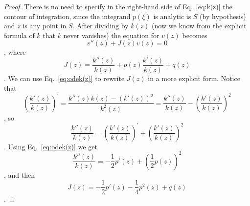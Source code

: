 \begin{proof}
   There is no need to specify in the right-hand side of Eq.~\eqref{eq:k(z)} the
   contour of integration, since the integrand
   $p(\xi)$ is analytic is $S$ (by hypothesis) and $z$ is any point in $S$.
   After dividing by $k(z)$ (now we know from the explicit formula of $k$ that
   $k$ never vanishes) the equation for $v(z)$ becomes  
   \begin{dmath}[label={odev(z)}]
      v''(z) + J(z) v(z) = 0
   \end{dmath},
   where 
   \begin{dmath*}
      J(z) = \frac{k''(z)}{k(z)} + p(z) \frac{k'(z)}{k(z)} + q(z)
   \end{dmath*}.
   We can use Eq.~\eqref{eq:odek(z)} to rewrite $J(z)$ in a more explicit form.
   Notice that
   \begin{dmath*}[compact]
      \left( \frac{k'(z)}{k(z)} \right)^{\prime} = 
      \frac{k''(z) k(z) - \left( k'(z) \right) ^{2} }{k^{2}(z)} = \frac{k''(z)}{k(z)}
      - \left( \frac{k'(z)}{k(z)} \right)^{2} 
   \end{dmath*},
   so
   \begin{dmath*}
      \frac{k''(z)}{k(z)} = \left( \frac{k'(z)}{k(z)} \right)^{\prime} + \left(
	 \frac{k'(z)}{k(z)} \right)^{2} 
   \end{dmath*}.
   Using Eq.~\eqref{eq:odek(z)} we get
   \begin{dmath*}
      \frac{k''(z)}{k(z)} = - \frac{1}{2} p'(z)  + \left( \frac{1}{2} p(z)
      \right)^{2}
   \end{dmath*},
   and then
   \begin{dmath}[label={J(z)}]
      J(z) =  - \frac{1}{2} p'(z) - \frac{1}{4} p^{2} (z) + q(z) 
   \end{dmath}.


\end{proof}
